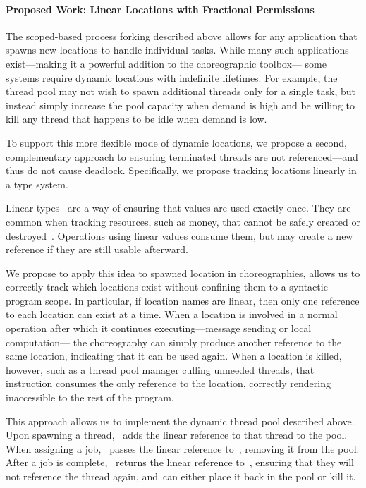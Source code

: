 \iffalse

\paragraph{Proposed Work: Linear Locations with Fractional Permissions}
The scoped-based process forking described above allows for any application that spawns new locations to handle individual tasks.
While many such applications exist---making it a powerful addition to the choreographic toolbox---%
some systems require dynamic locations with indefinite lifetimes.
For example, the thread pool may not wish to spawn additional threads only for a single task,
but instead simply increase the pool capacity when demand is high
and be willing to kill any thread that happens to be idle when demand is low.

To support this more flexible mode of dynamic locations, we propose a second, complementary approach to
ensuring terminated threads are not referenced---and thus do not cause deadlock.
Specifically, we propose tracking locations linearly in a type system.

Linear types~ are a way of ensuring that values are used exactly once.
They are common when tracking resources, such as money, that cannot be safely created or destroyed~\citep{move-lang,CoblenzOE+20,DasBHPS21}.
Operations using linear values consume them, but may create a new reference if they are still usable afterward.

We propose to apply this idea to spawned location in choreographies,
allows us to correctly track which locations exist without confining them to a syntactic program scope.
In particular, if location names are linear, then only one reference to each location can exist at a time.
When a location is involved in a normal operation after which it continues executing---message sending or local computation---%
the choreography can simply produce another reference to the same location, indicating that it can be used again.
When a location is killed, however, such as a thread pool manager culling unneeded threads,
that instruction consumes the only reference to the location, correctly rendering inaccessible to the rest of the program.

This approach allows us to implement the dynamic thread pool described above.
Upon spawning a thread, \Mngr~adds the linear reference to that thread to the pool.
When assigning a job, \Mngr~passes the linear reference to~\Client, removing it from the pool.
After a job is complete, \Client~returns the linear reference to~\Mngr, ensuring that they will not reference the thread again,
and~\Mngr can either place it back in the pool or kill it.

